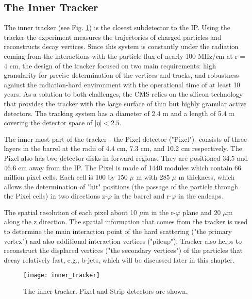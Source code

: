 \begin{normalsize}

\subsection{The Inner Tracker}

The inner tracker \cite{Tracker_phase2} (see Fig. \ref{inner_tracker}) is the closest subdetector to the IP. Using the tracker the experiment measures the trajectories of charged particles and reconstructs decay vertices. Since this system is constantly under the radiation coming from the interactions with the particle flux of nearly 100 MHz/cm at r = 4 cm, the design of the tracker focused on two main requirements: high granularity for precise determination of the vertices and tracks, and robustness against the radiation-hard environment with the operational time of at least 10 years. As a solution to both challenges, the CMS relies on the silicon technology that provides the tracker with the large surface of thin but highly granular active detectors. The tracking system has a diameter of 2.4 m and a length of 5.4 m covering the detector space of $|\eta|< 2.5$. 

The inner most part of the tracker - the Pixel detector ("Pixel")- consists of three layers in the barrel at the radii of 4.4 cm, 7.3 cm, and 10.2 cm respectively. The Pixel also has two detector disks in forward regions. They are positioned 34.5 and 46.6 cm away from the IP. The Pixel is made of 1440 modules which contain 66 million pixel cells. Each cell is 100 by 150 $\mu$ m with 285 $\mu$ m thickness, which allows the determination of "hit" positions (the passage of the particle through the Pixel cells) in two directions z-$\varphi$ in the barrel and r-$\varphi$ in the endcaps.

The spatial resolution of each pixel about 10 $\mu$m in the r-$\varphi$ plane and 20 $\mu$m along the z direction. The spatial information that comes from the tracker is used to determine the main interaction point of the hard scattering ("the primary vertex") and also additional interaction vertices ("pileup"). Tracker also helps to reconstruct the displaced vertices ("the secondary vertices") of the particles that decay relatively fast, e.g., b-jets, which will be discussed later in this chapter. 

\begin{figure}[h!]
  \centering
  \texttt{[image: inner\_tracker]}
  \caption[The inner tracker]{The inner tracker. Pixel and Strip detectors are shown. }
  \label{inner_tracker}
\end{figure}



\end{normalsize}
